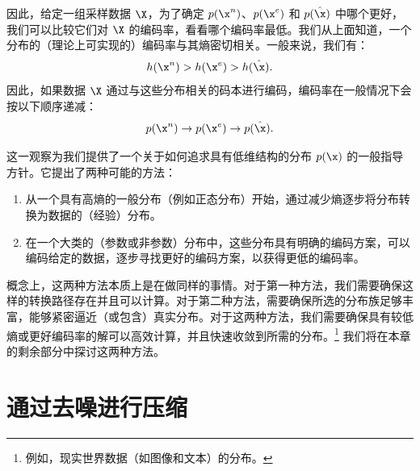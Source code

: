 \documentclass[../../book-main.tex]{subfiles}
\begin{document}
因此，给定一组采样数据 $\X$，为了确定 $p(\x^n)$、$p(\x^e)$ 和 $p(\hat \x)$ 中哪个更好，我们可以比较它们对 $\X$ 的编码率，看看哪个编码率最低。我们从上面知道，一个分布的（理论上可实现的）编码率与其熵密切相关。一般来说，我们有：
\begin{equation}
    h(\x^n) > h(\x^e) > h(\hat \x).
\end{equation}
因此，如果数据 $\X$ 通过与这些分布相关的码本进行编码，编码率在一般情况下会按以下顺序递减：
\begin{equation}
    p(\x^n) \rightarrow p(\x^e) \rightarrow p(\hat \x).
\end{equation}

这一观察为我们提供了一个关于如何追求具有低维结构的分布 \(p(\x)\) 的一般指导方针。它提出了两种可能的方法：
\begin{enumerate}
    \item 从一个具有高熵的一般分布（例如正态分布）开始，通过减少熵逐步将分布转换为数据的（经验）分布。
    \item 在一个大类的（参数或非参数）分布中，这些分布具有明确的编码方案，可以编码给定的数据，逐步寻找更好的编码方案，以获得更低的编码率。
\end{enumerate}
概念上，这两种方法本质上是在做同样的事情。对于第一种方法，我们需要确保这样的转换路径存在并且可以计算。对于第二种方法，需要确保所选的分布族足够丰富，能够紧密逼近（或包含）真实分布。对于这两种方法，我们需要确保具有较低熵或更好编码率的解可以高效计算，并且快速收敛到所需的分布。\footnote{例如，现实世界数据（如图像和文本）的分布。} 我们将在本章的剩余部分中探讨这两种方法。  %

\section{通过去噪进行压缩}\label{sub:compression_denoising}

\end{document}
